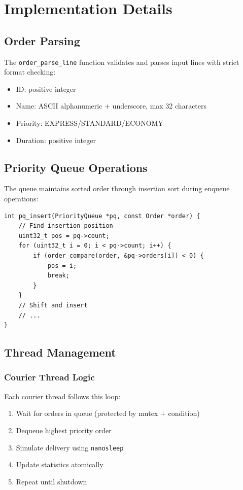 \documentclass[12pt,a4paper]{article}
\begin{document}
\section{Implementation Details}

\subsection{Order Parsing}

The \texttt{order\_parse\_line} function validates and parses input lines with strict format checking:

\begin{itemize}
    \item ID: positive integer
    \item Name: ASCII alphanumeric + underscore, max 32 characters
    \item Priority: EXPRESS/STANDARD/ECONOMY
    \item Duration: positive integer
\end{itemize}

\subsection{Priority Queue Operations}

The queue maintains sorted order through insertion sort during enqueue operations:

\begin{lstlisting}
int pq_insert(PriorityQueue *pq, const Order *order) {
    // Find insertion position
    uint32_t pos = pq->count;
    for (uint32_t i = 0; i < pq->count; i++) {
        if (order_compare(order, &pq->orders[i]) < 0) {
            pos = i;
            break;
        }
    }
    // Shift and insert
    // ...
}
\end{lstlisting}

\subsection{Thread Management}

\subsubsection{Courier Thread Logic}

Each courier thread follows this loop:

\begin{enumerate}
    \item Wait for orders in queue (protected by mutex + condition)
    \item Dequeue highest priority order
    \item Simulate delivery using \texttt{nanosleep}
    \item Update statistics atomically
    \item Repeat until shutdown
\end{enumerate}
\end{document}
